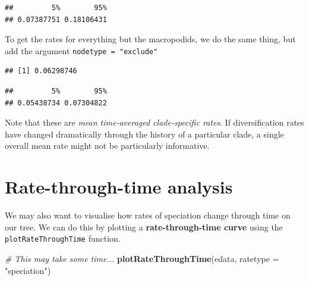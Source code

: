 \documentclass[]{book}
\newenvironment{Shaded}{\begin{snugshade}}{\end{snugshade}}
\newcommand{\KeywordTok}[1]{\textcolor[rgb]{0.13,0.29,0.53}{\textbf{{#1}}}}
\newcommand{\DataTypeTok}[1]{\textcolor[rgb]{0.13,0.29,0.53}{{#1}}}
\newcommand{\DecValTok}[1]{\textcolor[rgb]{0.00,0.00,0.81}{{#1}}}
\newcommand{\FloatTok}[1]{\textcolor[rgb]{0.00,0.00,0.81}{{#1}}}
\newcommand{\StringTok}[1]{\textcolor[rgb]{0.31,0.60,0.02}{{#1}}}
\newcommand{\CommentTok}[1]{\textcolor[rgb]{0.56,0.35,0.01}{\textit{{#1}}}}
\newcommand{\NormalTok}[1]{{#1}}
\begin{document}
\begin{verbatim}
##         5%        95% 
## 0.07387751 0.18106431
\end{verbatim}

To get the rates for everything but the macropodids, we do the same
thing, but add the argument \texttt{nodetype\ =\ "exclude"}

\begin{Shaded}
\end{Shaded}

\begin{verbatim}
## [1] 0.06298746
\end{verbatim}

\begin{Shaded}
\end{Shaded}

\begin{verbatim}
##         5%        95% 
## 0.05438734 0.07304822
\end{verbatim}

Note that these are \emph{mean time-averaged clade-specific rates}. If
diversification rates have changed dramatically through the history of a
particular clade, a single overall mean rate might not be particularly
informative.

\section{Rate-through-time analysis}\label{rate-through-time-analysis}

We may also want to visualise how rates of speciation change through
time on our tree. We can do this by plotting a \textbf{rate-through-time
curve} using the \texttt{plotRateThroughTime} function.

\begin{Shaded}
\begin{Highlighting}[]
\CommentTok{# This may take some time...}
\KeywordTok{plotRateThroughTime}\NormalTok{(edata, }\DataTypeTok{ratetype =} \StringTok{"speciation"}\NormalTok{)}
\end{Highlighting}
\end{Shaded}
\end{document}
